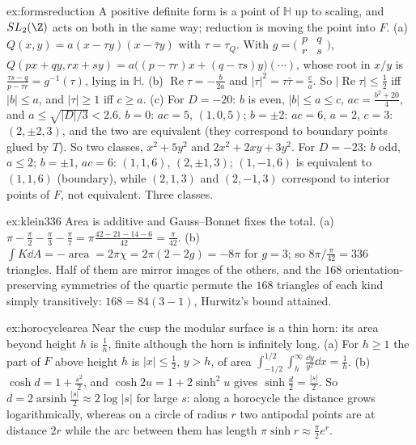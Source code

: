 \begin{solution}{ex:formsreduction}
\idea A positive definite form is a point of $\mathbb H$ up to scaling, and $SL_2(\Z)$ acts on both in the same way; reduction is moving the point into $F$.
\writeup (a) $Q(x,y)=a(x-\tau y)(x-\bar\tau y)$ with $\tau=\tau_Q$. With $g=\bigl(\begin{smallmatrix}p&q\\r&s\end{smallmatrix}\bigr)$, $Q(px+qy,rx+sy)=a\bigl((p-\tau r)x+(q-\tau s)y\bigr)(\cdots)$, whose root in $x/y$ is
$\frac{\tau s-q}{p-\tau r}=g^{-1}(\tau)$, lying in $\mathbb H$. (b) $\operatorname{Re}\tau=-\frac b{2a}$ and $|\tau|^2=\tau\bar\tau=\frac ca$. So $|\operatorname{Re}\tau|\le\frac12$ iff $|b|\le a$, and $|\tau|\ge1$ iff $c\ge a$. (c) For $D=-20$: $b$ is even,
$|b|\le a\le c$, $ac=\frac{b^2+20}4$, and $a\le\sqrt{|D|/3}<2.6$. $b=0$: $ac=5$, $(1,0,5)$; $b=\pm2$: $ac=6$, $a=2$, $c=3$: $(2,\pm2,3)$, and the two are equivalent (they correspond to boundary points
glued by $T$). So two classes, $x^2+5y^2$ and $2x^2+2xy+3y^2$. For $D=-23$: $b$ odd, $a\le2$; $b=\pm1$, $ac=6$: $(1,1,6)$, $(2,\pm1,3)$; $(1,-1,6)$ is equivalent to $(1,1,6)$ (boundary), while $(2,1,3)$ and $(2,-1,3)$
correspond to interior points of $F$, not equivalent. Three classes.
\end{solution}

\begin{solution}{ex:klein336}
\idea Area is additive and Gauss--Bonnet fixes the total.
\writeup (a) $\pi-\frac\pi2-\frac\pi3-\frac\pi7=\pi\frac{42-21-14-6}{42}=\frac\pi{42}$. (b) $\int K\dd A=-\operatorname{area}=2\pi\chi=2\pi(2-2g)=-8\pi$ for $g=3$; so $8\pi/\frac\pi{42}=336$ triangles. Half of them are mirror images of the
others, and the $168$ orientation-preserving symmetries of the quartic permute the $168$ triangles of each kind simply transitively: $168=84(3-1)$, Hurwitz's bound attained.
\end{solution}

\begin{solution}{ex:horocyclearea}
\idea Near the cusp the modular surface is a thin horn: its area beyond height $h$ is $\frac1h$, finite although the horn is infinitely long.
\writeup (a) For $h\ge1$ the part of $F$ above height $h$ is $|x|\le\frac12$, $y>h$, of area $\int_{-1/2}^{1/2}\int_h^\infty\frac{\dd y}{y^2}\dd x=\frac1h$. (b) $\cosh d=1+\frac{s^2}2$, and $\cosh2u=1+2\sinh^2u$ gives $\sinh\frac d2=\frac{|s|}2$. So
$d=2\operatorname{arsinh}\frac{|s|}2\approx2\log|s|$ for large $s$: along a horocycle the distance grows logarithmically, whereas on a circle of radius $r$ two antipodal points are at distance $2r$ while the
arc between them has length $\pi\sinh r\approx\frac\pi2e^r$.
\end{solution}

